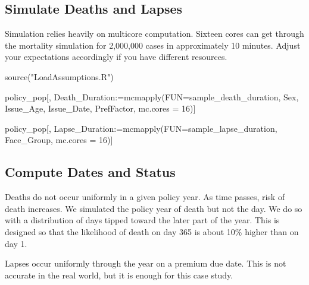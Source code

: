 \documentclass[
  letterpaper,
  DIV=11,
  numbers=noendperiod]{scrartcl}
\newenvironment{Shaded}{\begin{snugshade}}{\end{snugshade}}
\newcommand{\AttributeTok}[1]{\textcolor[rgb]{0.40,0.45,0.13}{#1}}
\newcommand{\DecValTok}[1]{\textcolor[rgb]{0.68,0.00,0.00}{#1}}
\newcommand{\ErrorTok}[1]{\textcolor[rgb]{0.68,0.00,0.00}{#1}}
\newcommand{\FunctionTok}[1]{\textcolor[rgb]{0.28,0.35,0.67}{#1}}
\newcommand{\NormalTok}[1]{\textcolor[rgb]{0.00,0.23,0.31}{#1}}
\newcommand{\SpecialCharTok}[1]{\textcolor[rgb]{0.37,0.37,0.37}{#1}}
\newcommand{\StringTok}[1]{\textcolor[rgb]{0.13,0.47,0.30}{#1}}
\begin{document}
\hypertarget{simulate-deaths-and-lapses}{%
\subsection{Simulate Deaths and
Lapses}\label{simulate-deaths-and-lapses}}

Simulation relies heavily on multicore computation. Sixteen cores can
get through the mortality simulation for 2,000,000 cases in
approximately 10 minutes. Adjust your expectations accordingly if you
have different resources.

\begin{Shaded}
\begin{Highlighting}[]
\FunctionTok{source}\NormalTok{(}\StringTok{"LoadAssumptions.R"}\NormalTok{)}

\NormalTok{policy\_pop[,}
\NormalTok{           Death\_Duration}\SpecialCharTok{:}\ErrorTok{=}\FunctionTok{mcmapply}\NormalTok{(}\AttributeTok{FUN=}\NormalTok{sample\_death\_duration,}
\NormalTok{                  Sex,}
\NormalTok{                  Issue\_Age,}
\NormalTok{                  Issue\_Date,}
\NormalTok{                  PrefFactor,}
                  \AttributeTok{mc.cores =} \DecValTok{16}\NormalTok{)]}


\NormalTok{policy\_pop[,}
\NormalTok{           Lapse\_Duration}\SpecialCharTok{:}\ErrorTok{=}\FunctionTok{mcmapply}\NormalTok{(}\AttributeTok{FUN=}\NormalTok{sample\_lapse\_duration,}
\NormalTok{                                    Face\_Group,}
                                    \AttributeTok{mc.cores =} \DecValTok{16}\NormalTok{)]}
\end{Highlighting}
\end{Shaded}

\hypertarget{compute-dates-and-status}{%
\subsection{Compute Dates and Status}\label{compute-dates-and-status}}

Deaths do not occur uniformly in a given policy year. As time passes,
risk of death increases. We simulated the policy year of death but not
the day. We do so with a distribution of days tipped toward the later
part of the year. This is designed so that the likelihood of death on
day 365 is about 10\% higher than on day 1.

Lapses occur uniformly through the year on a premium due date. This is
not accurate in the real world, but it is enough for this case study.
\end{document}
